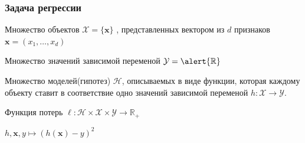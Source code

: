 \documentclass[notheorems]{beamer} %
\begin{document}

\begin{frame}
	\frametitle{Задача регрессии}
	
	
	Множество объектов  $\mathcal{X}=\{\textbf{x} \}$ , представленных вектором из  $d$ признаков $\textbf{x}=(x_1, \dots,x_d)$
	
	Множество значений зависимой переменой $\mathcal{Y}=\alert{\mathbb{R}}$  
	
	Множество моделей(гипотез) $\mathcal{H}$, описываемых в виде функции, которая каждому объекту ставит в соответствие одно  значений зависимой переменой $h: \mathcal{X} \to \mathcal{Y}$.
	
	Функция потерь $ \ell:\mathcal{H} \times \mathcal{X} \times \mathcal{Y} \to \mathbb{R_+}$
	
	\alert{$ h,\textbf{x},y \mapsto (h(\textbf{x})-y)^2$}
	
\end{frame}
\end{document}
